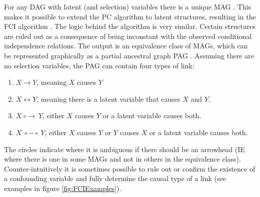 For any DAG with latent (and selection) variables there is a unique MAG \citep{Richardson2002}. This makes it possible to extend the PC algorithm to latent structures, resulting in the FCI algorithm \citep{Sprites2000}. The logic behind the algorithm is very similar. Certain structures are ruled out as a consequence of being inconstant with the observed conditional independence relations. The output is an equivalence class of MAGs, which can be represented graphically as a partial ancestral graph PAG \citep{Spirtes1995}. Assuming there are no selection variables, the PAG can contain four types of link:

\begin{enumerate}
\item $X \rightarrow Y$, meaning $X$ causes $Y$
\item $X \leftrightarrow Y$, meaning there is a latent variable that causes $X$ and $Y$.
\item $X\ {\circ} {\rightarrow}\ Y$, either $X$ causes $Y$ or a latent variable causes both.
\item $X\ {\circ} {-}  {\circ}\ Y$, either $X$ causes $Y$ or $Y$ causes $X$ or a latent variable causes both.
\end{enumerate}

The circles indicate where it is ambiguous if there should be an arrowhead (IE where there is one in some MAGs and not in others in the equivalence class). Counter-intuitively it is sometimes possible to  rule out or confirm the existence of a confounding variable and fully determine the causal type of a link (see examples in figure \ref{fig:FCIExamples}). 


